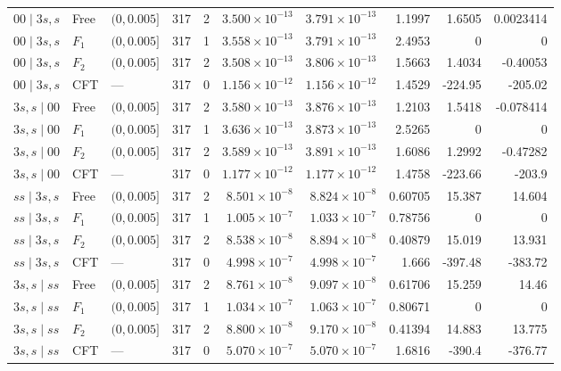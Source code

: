\begin{longtable}{lllrrrrrrr}
\midrule
$00\mid 3s,s$ & Free & $(0,0.005]$ & 317 & 2 & $3.500\!\times\!10^{-13}$ & $3.791\!\times\!10^{-13}$ & 1.1997 & 1.6505 & 0.0023414\\*
$00\mid 3s,s$ & $F_1$ & $(0,0.005]$ & 317 & 1 & $3.558\!\times\!10^{-13}$ & $3.791\!\times\!10^{-13}$ & 2.4953 & 0 & 0\\*
$00\mid 3s,s$ & $F_2$ & $(0,0.005]$ & 317 & 2 & $3.508\!\times\!10^{-13}$ & $3.806\!\times\!10^{-13}$ & 1.5663 & 1.4034 & -0.40053\\*
$00\mid 3s,s$ & CFT & --- & 317 & 0 & $1.156\!\times\!10^{-12}$ & $1.156\!\times\!10^{-12}$ & 1.4529 & -224.95 & -205.02\\
\midrule
$3s,s\mid 00$ & Free & $(0,0.005]$ & 317 & 2 & $3.580\!\times\!10^{-13}$ & $3.876\!\times\!10^{-13}$ & 1.2103 & 1.5418 & -0.078414\\*
$3s,s\mid 00$ & $F_1$ & $(0,0.005]$ & 317 & 1 & $3.636\!\times\!10^{-13}$ & $3.873\!\times\!10^{-13}$ & 2.5265 & 0 & 0\\*
$3s,s\mid 00$ & $F_2$ & $(0,0.005]$ & 317 & 2 & $3.589\!\times\!10^{-13}$ & $3.891\!\times\!10^{-13}$ & 1.6086 & 1.2992 & -0.47282\\*
$3s,s\mid 00$ & CFT & --- & 317 & 0 & $1.177\!\times\!10^{-12}$ & $1.177\!\times\!10^{-12}$ & 1.4758 & -223.66 & -203.9\\
\midrule
$ss\mid 3s,s$ & Free & $(0,0.005]$ & 317 & 2 & $8.501\!\times\!10^{-8}$ & $8.824\!\times\!10^{-8}$ & 0.60705 & 15.387 & 14.604\\*
$ss\mid 3s,s$ & $F_1$ & $(0,0.005]$ & 317 & 1 & $1.005\!\times\!10^{-7}$ & $1.033\!\times\!10^{-7}$ & 0.78756 & 0 & 0\\*
$ss\mid 3s,s$ & $F_2$ & $(0,0.005]$ & 317 & 2 & $8.538\!\times\!10^{-8}$ & $8.894\!\times\!10^{-8}$ & 0.40879 & 15.019 & 13.931\\*
$ss\mid 3s,s$ & CFT & --- & 317 & 0 & $4.998\!\times\!10^{-7}$ & $4.998\!\times\!10^{-7}$ & 1.666 & -397.48 & -383.72\\
\midrule
$3s,s\mid ss$ & Free & $(0,0.005]$ & 317 & 2 & $8.761\!\times\!10^{-8}$ & $9.097\!\times\!10^{-8}$ & 0.61706 & 15.259 & 14.46\\*
$3s,s\mid ss$ & $F_1$ & $(0,0.005]$ & 317 & 1 & $1.034\!\times\!10^{-7}$ & $1.063\!\times\!10^{-7}$ & 0.80671 & 0 & 0\\*
$3s,s\mid ss$ & $F_2$ & $(0,0.005]$ & 317 & 2 & $8.800\!\times\!10^{-8}$ & $9.170\!\times\!10^{-8}$ & 0.41394 & 14.883 & 13.775\\*
$3s,s\mid ss$ & CFT & --- & 317 & 0 & $5.070\!\times\!10^{-7}$ & $5.070\!\times\!10^{-7}$ & 1.6816 & -390.4 & -376.77\\
\end{longtable}
\endgroup

